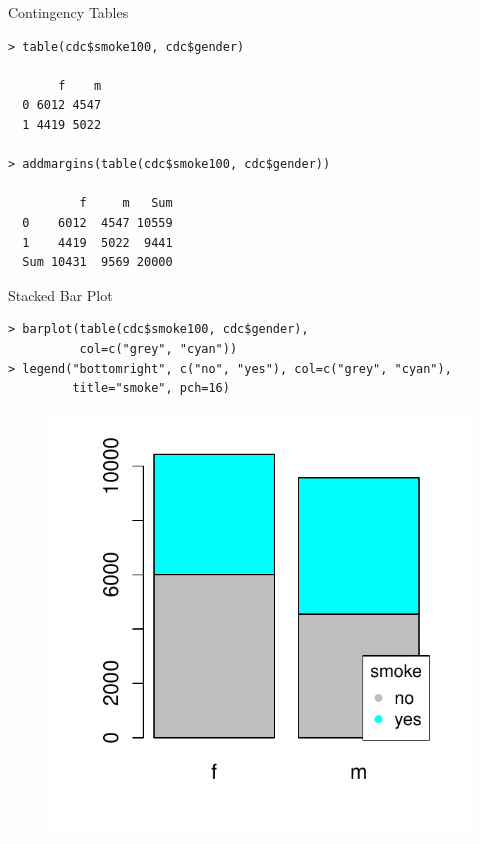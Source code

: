 \documentclass[10pt]{beamer}
\begin{document}
\begin{frame}[fragile]{Contingency Tables}
\begin{verbatim}
> table(cdc$smoke100, cdc$gender)

       f    m
  0 6012 4547
  1 4419 5022
  
> addmargins(table(cdc$smoke100, cdc$gender))

          f     m   Sum
  0    6012  4547 10559
  1    4419  5022  9441
  Sum 10431  9569 20000
\end{verbatim}
\end{frame}

\begin{frame}[fragile]{Stacked Bar Plot}
\begin{verbatim}
> barplot(table(cdc$smoke100, cdc$gender), 
          col=c("grey", "cyan"))
> legend("bottomright", c("no", "yes"), col=c("grey", "cyan"), 
         title="smoke", pch=16)
\end{verbatim}

\begin{figure}[htbp]
\centering
\includegraphics[scale=0.5]{figure/barplot_smokegen_stacked.pdf}
\end{figure}
\end{frame}
\end{document}

